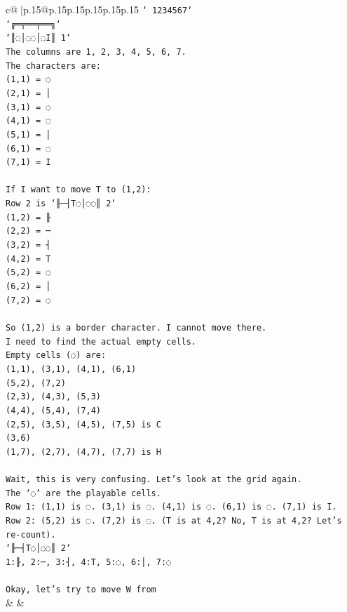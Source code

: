 \documentclass{article}
\begin{document}
{\begin{supertabular}{c@{$\;$}|p{.15\linewidth}@{}p{.15\linewidth}p{.15\linewidth}p{.15\linewidth}p{.15\linewidth}p{.15\linewidth}}
{{{\texttt{` 1234567`} \\
\texttt{`╔═╤══╤══╗`} \\
\texttt{`║◌│◌◌│◌I║ 1`} \\
\texttt{The columns are 1, 2, 3, 4, 5, 6, 7.} \\
\texttt{The characters are:} \\
\texttt{(1,1) = ◌} \\
\texttt{(2,1) = │} \\
\texttt{(3,1) = ◌} \\
\texttt{(4,1) = ◌} \\
\texttt{(5,1) = │} \\
\texttt{(6,1) = ◌} \\
\texttt{(7,1) = I} \\
\\ 
\texttt{If I want to move T to (1,2):} \\
\texttt{Row 2 is `╟─┤T◌│◌◌║ 2`} \\
\texttt{(1,2) = ╟} \\
\texttt{(2,2) = ─} \\
\texttt{(3,2) = ┤} \\
\texttt{(4,2) = T} \\
\texttt{(5,2) = ◌} \\
\texttt{(6,2) = │} \\
\texttt{(7,2) = ◌} \\
\\ 
\texttt{So (1,2) is a border character. I cannot move there.} \\
\texttt{I need to find the actual empty cells.} \\
\texttt{Empty cells (◌) are:} \\
\texttt{(1,1), (3,1), (4,1), (6,1)} \\
\texttt{(5,2), (7,2)} \\
\texttt{(2,3), (4,3), (5,3)} \\
\texttt{(4,4), (5,4), (7,4)} \\
\texttt{(2,5), (3,5), (4,5), (7,5) is C} \\
\texttt{(3,6)} \\
\texttt{(1,7), (2,7), (4,7), (7,7) is H} \\
\\ 
\texttt{Wait, this is very confusing. Let's look at the grid again.} \\
\texttt{The `◌` are the playable cells.} \\
\texttt{Row 1: (1,1) is ◌. (3,1) is ◌. (4,1) is ◌. (6,1) is ◌. (7,1) is I.} \\
\texttt{Row 2: (5,2) is ◌. (7,2) is ◌. (T is at 4,2? No, T is at 4,2? Let's re{-}count).} \\
\texttt{`╟─┤T◌│◌◌║ 2`} \\
\texttt{1:╟, 2:─, 3:┤, 4:T, 5:◌, 6:│, 7:◌} \\
\\ 
\texttt{Okay, let's try to move W from} \\
            }
        }
    }
    & & \\ \\


\end{supertabular}}
\end{document}
